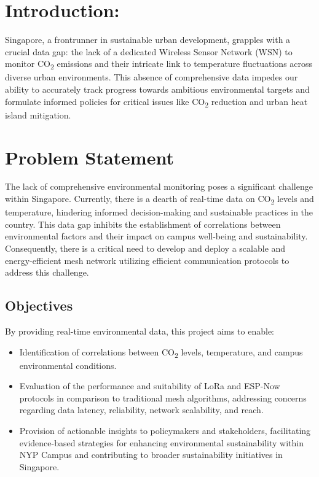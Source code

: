 \section*{Introduction:}\label{sec:introduction}
Singapore, a frontrunner in sustainable urban development, grapples with a crucial data gap: the lack of a dedicated Wireless Sensor Network (WSN) to monitor CO\textsubscript{2} emissions and their intricate link to temperature fluctuations across diverse urban environments. This absence of comprehensive data impedes our ability to accurately track progress towards ambitious environmental targets and formulate informed policies for critical issues like CO\textsubscript{2} reduction and urban heat island mitigation.

\section*{Problem Statement}\label{sec:problem_statement}
The lack of comprehensive environmental monitoring poses a significant challenge within Singapore. Currently, there is a dearth of real-time data on CO\textsubscript{2} levels and temperature, hindering informed decision-making and sustainable practices in the country. This data gap inhibits the establishment of correlations between environmental factors and their impact on campus well-being and sustainability. Consequently, there is a critical need to develop and deploy a scalable and energy-efficient mesh network utilizing efficient communication protocols to address this challenge. 

\subsection{Objectives}\label{sec:objectives}

By providing real-time environmental data, this project aims to enable:

\begin{itemize}
    \item Identification of correlations between CO\textsubscript{2} levels, temperature, and campus environmental conditions.
    \item Evaluation of the performance and suitability of LoRa and ESP-Now protocols in comparison to traditional mesh algorithms, addressing concerns regarding data latency, reliability, network scalability, and reach.
    \item Provision of actionable insights to policymakers and stakeholders, facilitating evidence-based strategies for enhancing environmental sustainability within NYP Campus and contributing to broader sustainability initiatives in Singapore.
\end{itemize}

